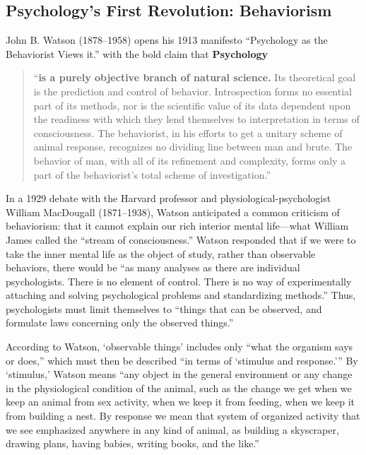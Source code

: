 \begin{refsection}
\subsection{Psychology's First Revolution: Behaviorism}
\label{psychologysfirstrevolution:behaviorism}

John B. Watson (1878--1958) opens his 1913 manifesto ``Psychology as the Behaviorist Views it.'' with the bold claim that \textbf{Psychology}

\begin{quote}

``\textbf{is a purely objective branch of natural science.} Its theoretical goal is the prediction and control of behavior. Introspection forms no essential part of its methods, nor is the scientific value of its data dependent upon the readiness with which they lend themselves to interpretation in terms of consciousness. The behaviorist, in his efforts to get a unitary scheme of animal response, recognizes no dividing line between man and brute. The behavior of man, with all of its refinement and complexity, forms only a part of the behaviorist's total scheme of investigation.'' ~\citep[p. 158]{Watson:1913tq}
\end{quote}

In a 1929 debate with the Harvard professor and physiological-psychologist William MacDougall (1871--1938), Watson anticipated a common criticism of behaviorism: that it cannot explain our rich interior mental life---what William James called the ``stream of consciousness.'' Watson responded that if we were to take the inner mental life as the object of study, rather than observable behaviors, there would be ``as many analyses as there are individual psychologists. There is no element of control. There is no way of experimentally attaching and solving psychological problems and standardizing methods.'' Thus, psychologists must limit themselves to ``things that can be observed, and formulate laws concerning only the observed things.'' ~\citep{Watson:iMwU-3B8}

According to Watson, `observable things' includes only ``what the organism says or does,'' which must then be described ``in terms of `stimulus and response.''' By `stimulus,' Watson means ``any object in the general environment or any change in the physiological condition of the animal, such as the change we get when we keep an animal from sex activity, when we keep it from feeding, when we keep it from building a nest. By response we mean that system of organized activity that we see emphasized anywhere in any kind of animal, as building a skyscraper, drawing plans, having babies, writing books, and the like.''


\end{refsection}
